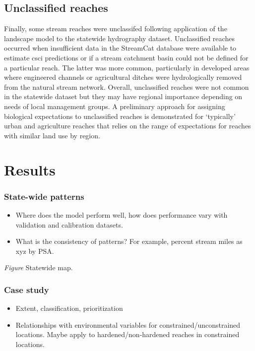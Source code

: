 \documentclass[]{article}
\begin{document}
\subsection{Unclassified reaches}\label{unclassified-reaches}

Finally, some stream reaches were unclassifed following application of
the landscape model to the statewide hydrography dataset. Unclassified
reaches occurred when insufficient data in the StreamCat database were
available to estimate \ac{csci} predictions or if a stream catchment
basin could not be defined for a particular reach. The latter was more
common, particularly in developed areas where engineered channels or
agricultural ditches were hydrologically removed from the natural stream
network. Overall, unclassified reaches were not common in the statewide
dataset but they may have regional importance depending on needs of
local management groups. A preliminary approach for assigning biological
expectations to unclassified reaches is demonstrated for `typically'
urban and agriculture reaches that relies on the range of expectations
for reaches with similar land use by region.

\section{Results}\label{results}

\subsubsection{State-wide patterns}\label{state-wide-patterns}

\begin{itemize}
\item
  Where does the model perform well, how does performance vary with
  validation and calibration datasets.
\item
  What is the consistency of patterns? For example, percent stream miles
  as xyz by PSA.
\end{itemize}

\emph{Figure} Statewide map.

\subsubsection{Case study}\label{case-study}

\begin{itemize}
\item
  Extent, classification, prioritization
\item
  Relationships with environmental variables for
  constrained/unconstrained locations. Maybe apply to
  hardened/non-hardened reaches in constrained locations.
\end{itemize}
\end{document}
